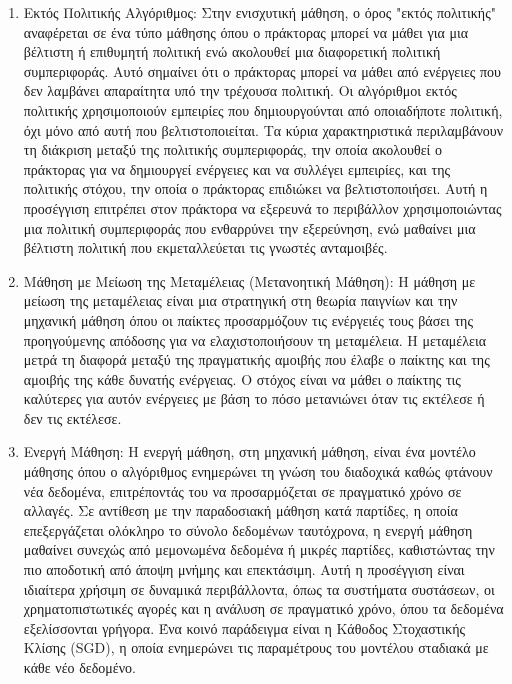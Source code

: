 \begin{enumerate}
    \item Εκτός Πολιτικής Αλγόριθμος: Στην ενισχυτική μάθηση, ο όρος "εκτός πολιτικής" αναφέρεται σε ένα τύπο μάθησης όπου ο πράκτορας μπορεί να μάθει για μια βέλτιστη ή επιθυμητή πολιτική ενώ ακολουθεί μια διαφορετική πολιτική συμπεριφοράς. Αυτό σημαίνει ότι ο πράκτορας μπορεί να μάθει από ενέργειες που δεν λαμβάνει απαραίτητα υπό την τρέχουσα πολιτική. Οι αλγόριθμοι εκτός πολιτικής χρησιμοποιούν εμπειρίες που δημιουργούνται από οποιαδήποτε πολιτική, όχι μόνο από αυτή που βελτιστοποιείται. Τα κύρια χαρακτηριστικά περιλαμβάνουν τη διάκριση μεταξύ της πολιτικής συμπεριφοράς, την οποία ακολουθεί ο πράκτορας για να δημιουργεί ενέργειες και να συλλέγει εμπειρίες, και της πολιτικής στόχου, την οποία ο πράκτορας επιδιώκει να βελτιστοποιήσει. Αυτή η προσέγγιση επιτρέπει στον πράκτορα να εξερευνά το περιβάλλον χρησιμοποιώντας μια πολιτική συμπεριφοράς που ενθαρρύνει την εξερεύνηση, ενώ μαθαίνει μια βέλτιστη πολιτική που εκμεταλλεύεται τις γνωστές ανταμοιβές. 

    \item Μάθηση με Μείωση της Μεταμέλειας (Μετανοητική Μάθηση): Η μάθηση με μείωση της μεταμέλειας είναι μια στρατηγική στη θεωρία παιγνίων και την μηχανική μάθηση όπου οι παίκτες προσαρμόζουν τις ενέργειές τους βάσει της προηγούμενης απόδοσης για να ελαχιστοποιήσουν τη μεταμέλεια. Η μεταμέλεια μετρά τη διαφορά μεταξύ της πραγματικής αμοιβής που έλαβε ο παίκτης και της αμοιβής της κάθε δυνατής ενέργειας. Ο στόχος είναι να μάθει ο παίκτης τις καλύτερες για αυτόν ενέργειες με βάση το πόσο μετανιώνει όταν τις εκτέλεσε ή δεν τις εκτέλεσε. 

    \item Ενεργή Μάθηση: Η ενεργή μάθηση, στη μηχανική μάθηση, είναι ένα μοντέλο μάθησης όπου ο αλγόριθμος ενημερώνει τη γνώση του διαδοχικά καθώς φτάνουν νέα δεδομένα, επιτρέποντάς του να προσαρμόζεται σε πραγματικό χρόνο σε αλλαγές. Σε αντίθεση με την παραδοσιακή μάθηση κατά παρτίδες, η οποία επεξεργάζεται ολόκληρο το σύνολο δεδομένων ταυτόχρονα, η ενεργή μάθηση μαθαίνει συνεχώς από μεμονωμένα δεδομένα ή μικρές παρτίδες, καθιστώντας την πιο αποδοτική από άποψη μνήμης και επεκτάσιμη. Αυτή η προσέγγιση είναι ιδιαίτερα χρήσιμη σε δυναμικά περιβάλλοντα, όπως τα συστήματα συστάσεων, οι χρηματοπιστωτικές αγορές και η ανάλυση σε πραγματικό χρόνο, όπου τα δεδομένα εξελίσσονται γρήγορα. Ένα κοινό παράδειγμα είναι η Κάθοδος Στοχαστικής Κλίσης (SGD), η οποία ενημερώνει τις παραμέτρους του μοντέλου σταδιακά με κάθε νέο δεδομένο. 


\end{enumerate}
